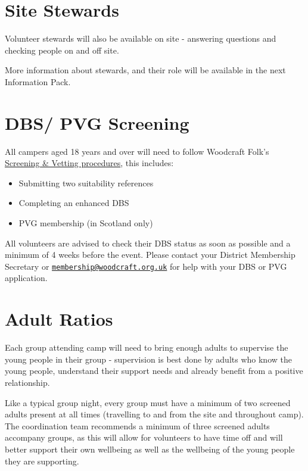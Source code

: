 \documentclass[a4paper, 11pt]{report}
\newcommand{\nl}{\newline}
\begin{document}
\section{Site Stewards}
Volunteer stewards will also be available on site - answering questions and checking people on and off site.\nl

More information about stewards, and their role will be available in the next Information Pack.

\section{DBS/ PVG Screening}
All campers aged 18 years and over will need to follow Woodcraft Folk's \href{https://woodcraft.org.uk/resources/volunteer-screening/}{Screening \& Vetting procedures}, this includes: 
\begin{itemize}
    \item Submitting two suitability references
    \item Completing an enhanced DBS 
    \item PVG membership (in Scotland only) 
\end{itemize}
All volunteers are advised to check their DBS status as soon as possible and a minimum of 4 weeks before the event. Please contact your District Membership Secretary or \href{mailto:membership@woodcraft.org.uk}{\texttt{membership@woodcraft.org.uk}} for help with your DBS or PVG application.

\section{Adult Ratios}
Each group attending camp will need to bring enough adults to supervise the young people in their group - supervision is best done by adults who know the young people, understand their support needs and already benefit from a positive relationship.\nl

Like a typical group night, every group must have a minimum of two screened adults present at all times (travelling to and from the site and throughout camp). The coordination team recommends a minimum of three screened adults accompany groups, as this will allow for volunteers to have time off and will better support their own wellbeing as well as the wellbeing of the young people they are supporting.\nl
\end{document}
